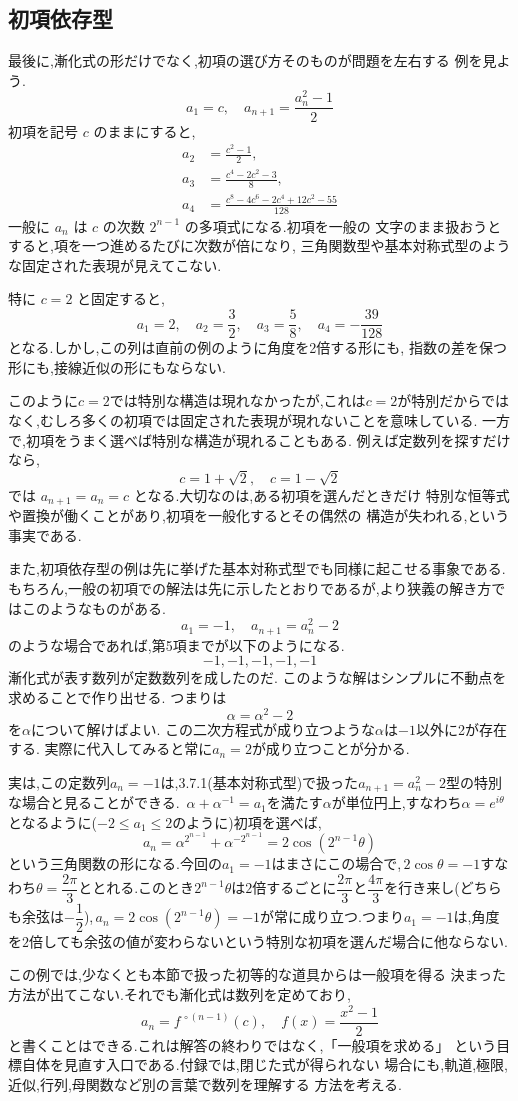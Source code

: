 \subsection{初項依存型}

最後に,漸化式の形だけでなく,初項の選び方そのものが問題を左右する
例を見よう.
\[
  a_1=c,
  \quad
  a_{n+1}=\frac{a_n^2-1}{2}
\]
初項を記号 $c$ のままにすると,
\begin{align*}
  a_2&=\frac{c^2-1}{2},\\
  a_3&=\frac{c^4-2c^2-3}{8},\\
  a_4&=\frac{c^8-4c^6-2c^4+12c^2-55}{128}
\end{align*}
一般に $a_n$ は $c$ の次数 $2^{n-1}$ の多項式になる.初項を一般の
文字のまま扱おうとすると,項を一つ進めるたびに次数が倍になり,
三角関数型や基本対称式型のような固定された表現が見えてこない.

特に $c=2$ と固定すると,
\[
  a_1=2,
  \quad
  a_2=\frac{3}{2},
  \quad
  a_3=\frac{5}{8},
  \quad
  a_4=-\frac{39}{128}
\]
となる.しかし,この列は直前の例のように角度を2倍する形にも,
指数の差を保つ形にも,接線近似の形にもならない.

このように$c=2$では特別な構造は現れなかったが,これは$c=2$が特別だからではなく,むしろ多くの初項では固定された表現が現れないことを意味している.
一方で,初項をうまく選べば特別な構造が現れることもある.
例えば定数列を探すだけなら,
\[
  c=1+\sqrt{2},
  \quad
  c=1-\sqrt{2}
\]
では $a_{n+1}=a_n=c$ となる.大切なのは,ある初項を選んだときだけ
特別な恒等式や置換が働くことがあり,初項を一般化するとその偶然の
構造が失われる,という事実である.

また,初項依存型の例は先に挙げた基本対称式型でも同様に起こせる事象である.
もちろん,一般の初項での解法は先に示したとおりであるが,より狭義の解き方ではこのようなものがある.
\[
  a_1=-1,\quad a_{n+1}=a_n^2-2
\]
のような場合であれば,第5項までが以下のようになる.
\[
  -1,-1,-1,-1,-1
\]
漸化式が表す数列が定数数列を成したのだ.
このような解はシンプルに不動点を求めることで作り出せる.
つまりは
\[
  \alpha=\alpha^2-2
\]
を$\alpha$について解けばよい.
この二次方程式が成り立つような$\alpha$は$-1$以外に2が存在する.
実際に代入してみると常に$a_n=2$が成り立つことが分かる.

実は,この定数列$a_n=-1$は,3.7.1(基本対称式型)で扱った$a_{n+1}=a_n^2-2$型の特別な場合と見ることができる.
\,$\alpha+\alpha^{-1}=a_1$を満たす$\alpha$が単位円上,すなわち$\alpha=e^{i\theta}$となるように($-2\le a_1\le2$のように)初項を選べば,
\[
  a_n=\alpha^{2^{n-1}}+\alpha^{-2^{n-1}}=2\cos(2^{n-1}\theta)
\]
という三角関数の形になる.今回の$a_1=-1$はまさにこの場合で,\,$2\cos\theta=-1$すなわち$\theta=\dfrac{2\pi}3$ととれる.このとき$2^{n-1}\theta$は$2$倍するごとに$\dfrac{2\pi}3$と$\dfrac{4\pi}3$を行き来し(どちらも余弦は$-\dfrac12$),\,$a_n=2\cos(2^{n-1}\theta)=-1$が常に成り立つ.つまり$a_1=-1$は,角度を$2$倍しても余弦の値が変わらないという特別な初項を選んだ場合に他ならない.

この例では,少なくとも本節で扱った初等的な道具からは一般項を得る
決まった方法が出てこない.それでも漸化式は数列を定めており,
\[
  a_n=f^{\,\circ(n-1)}(c),
  \quad
  f(x)=\frac{x^2-1}{2}
\]
と書くことはできる.これは解答の終わりではなく,「一般項を求める」
という目標自体を見直す入口である.付録では,閉じた式が得られない
場合にも,軌道,極限,近似,行列,母関数など別の言葉で数列を理解する
方法を考える.
